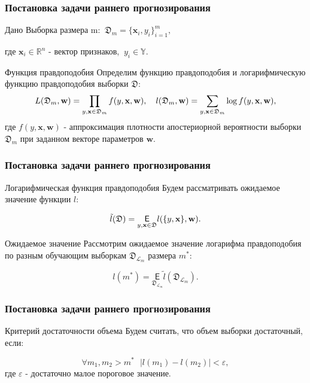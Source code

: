 \documentclass{beamer}
\begin{document}
\begin{frame}
\frametitle{Постановка задачи раннего прогнозирования}
\begin{block}{Дано}
Выборка размера m: $~\mathfrak D_m = \{\textbf{x}_i, y_i\}_{i=1}^m,$

где $\textbf{x}_i \in \mathbb{R}^{n}$ - вектор признаков, $~y_i \in \mathbb{Y}$.
\end{block}
\begin{block}{Функция правдоподобия}
Определим функцию правдоподобия и логарифмическую функцию правдоподобия выборки $\mathfrak D$:
$$
L(\mathfrak D_m, \textbf{w}) = \prod_{y, \textbf{x} \in \mathfrak D_m} f(y, \textbf{x}, \textbf{w}),~~~ l(\mathfrak D_m, \textbf w) = \sum_{y, \textbf{x} \in \mathfrak D_m}\log f(y, \textbf{x}, \textbf{w}),
$$
где $f(y, \textbf{x}, \textbf{w})$ - аппроксимация плотности апостериорной вероятности выборки $\mathfrak D_m$ при заданном векторе параметров $\textbf{w}$.
\end{block}
\end{frame}

\begin{frame}
\frametitle{Постановка задачи раннего прогнозирования}
\begin{block}{Логарифмическая функция правдоподобия}
Будем рассматривать ожидаемое значение функции $l$:

$$
\tilde{l}(\mathfrak D)  = \underset{y, \textbf{x} \in \mathfrak D}{\mathsf E} l(\{y, \textbf{x}\}, \textbf w).
$$
\end{block}
\begin{block}{Ожидаемое значение}
Рассмотрим ожидаемое значение логарифма правдоподобия по разным обучающим выборкам $\mathfrak D_{\mathcal L_m}$ размера $m^*$:

$$
l(m^*) = \underset{\mathfrak D_{\mathcal L_m}}{\mathsf E} \tilde{l}(\mathfrak D_{\mathcal L_m}).
$$
\end{block}
\end{frame}


\begin{frame}
\frametitle{Постановка задачи раннего прогнозирования}
\begin{block}{Критерий достаточности объема}
Будем считать, что объем выборки достаточный, если:

$$
\forall m_1, m_2 > m^* ~~~ |l(m_1) - l(m_2)| < \varepsilon,
$$
где $\varepsilon$ - достаточно малое пороговое значение.
\end{block}
\end{frame}
\end{document}
